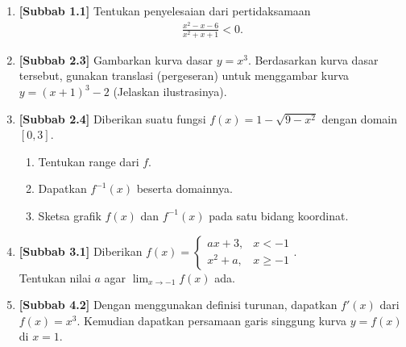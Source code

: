 \documentclass[10pt,openany,a4paper]{article}
\theoremstyle{definition}
\theoremstyle{definition}
\theoremstyle{plain}
\begin{document}
\begin{enumerate}
    \item \textbf{[Subbab 1.1]} Tentukan penyelesaian dari pertidaksamaan
    \begin{align*}
        \frac{x^2-x-6}{x^2+x+1}<0.
    \end{align*}

    \item \textbf{[Subbab 2.3]} Gambarkan kurva dasar $y=x^3$. Berdasarkan kurva dasar tersebut, gunakan translasi (pergeseran) untuk menggambar kurva $y=(x+1)^3-2$ (Jelaskan ilustrasinya).

    \item \textbf{[Subbab 2.4]} Diberikan suatu fungsi $f(x)=1-\sqrt{9-x^2}$ dengan domain $[0,3]$.
    \begin{enumerate}
        \item Tentukan range dari $f$.
        \item Dapatkan $f^{-1}(x)$ beserta domainnya.
        \item Sketsa grafik $f(x)$ dan $f^{-1}(x)$ pada satu bidang koordinat.
    \end{enumerate}

    \item \textbf{[Subbab 3.1]} Diberikan $f(x)=\begin{cases}
        ax+3, & x<-1\\
        x^2+a, & x\geq -1
    \end{cases}$.\\
    Tentukan nilai $a$ agar $\displaystyle\lim_{x\to -1}f(x)$ ada.

    \item \textbf{[Subbab 4.2]} Dengan menggunakan definisi turunan, dapatkan $f'(x)$ dari $f(x)=x^3$. Kemudian dapatkan persamaan garis singgung kurva $y=f(x)$ di $x=1$.
\end{enumerate}

\newpage
\end{document}
